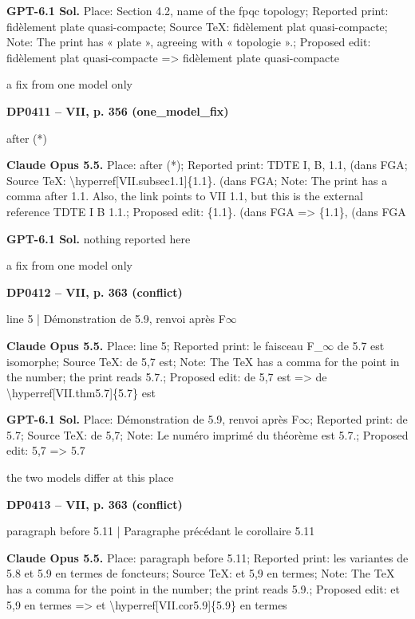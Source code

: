 \textbf{GPT-6.1 Sol.} Place: Section 4.2, name of the fpqc topology; Reported print: fidèlement plate quasi-compacte; Source TeX: fidèlement plat quasi-compacte; Note: The print has « plate », agreeing with « topologie ».; Proposed edit: fidèlement plat quasi-compacte =\allowbreak > fidèlement plate quasi-compacte\par
a fix from one model only\par
\par\noindent\hypertarget{DP0411}{}\textbf{DP0411 -- VII, p. 356 (one\_model\_fix)}\par
after (*)\par
\textbf{Claude Opus 5.5.} Place: after (*); Reported print: TDTE I, B, 1.1, (dans FGA; Source TeX: \textbackslash{}hyperref[VII.subsec1.1]\{1.1\}. (dans FGA; Note: The print has a comma after 1.1. Also, the link points to VII 1.1, but this is the external reference TDTE I B 1.1.; Proposed edit: \{1.1\}. (dans FGA =\allowbreak > \{1.1\}, (dans FGA\par
\textbf{GPT-6.1 Sol.} nothing reported here\par
a fix from one model only\par
\par\noindent\hypertarget{DP0412}{}\textbf{DP0412 -- VII, p. 363 (conflict)}\par
line 5 | Démonstration de 5.9, renvoi après F\ensuremath{\infty}\par
\textbf{Claude Opus 5.5.} Place: line 5; Reported print: le faisceau F\_\ensuremath{\infty} de 5.7 est isomorphe; Source TeX: de 5,7 est; Note: The TeX has a comma for the point in the number; the print reads 5.7.; Proposed edit: de 5,7 est =\allowbreak > de \textbackslash{}hyperref[VII.thm5.7]\{5.7\} est\par
\textbf{GPT-6.1 Sol.} Place: Démonstration de 5.9, renvoi après F\ensuremath{\infty}; Reported print: de 5.7; Source TeX: de 5,7; Note: Le numéro imprimé du théorème est 5.7.; Proposed edit: 5,7 =\allowbreak > 5.7\par
the two models differ at this place\par
\par\noindent\hypertarget{DP0413}{}\textbf{DP0413 -- VII, p. 363 (conflict)}\par
paragraph before 5.11 | Paragraphe précédant le corollaire 5.11\par
\textbf{Claude Opus 5.5.} Place: paragraph before 5.11; Reported print: les variantes de 5.8 et 5.9 en termes de foncteurs; Source TeX: et 5,9 en termes; Note: The TeX has a comma for the point in the number; the print reads 5.9.; Proposed edit: et 5,9 en termes =\allowbreak > et \textbackslash{}hyperref[VII.cor5.9]\{5.9\} en termes\par
